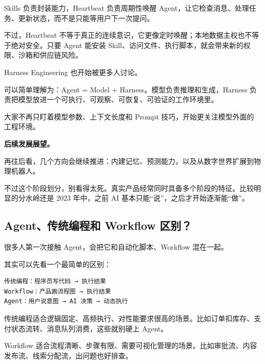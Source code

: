 \documentclass[10pt,a4paper]{ctexart}
\begin{document}
Skills 负责封装能力，Heartbeat 负责周期性唤醒 Agent，让它检查消息、处理任务、更新状态，而不是只能等用户下一次提问。



不过，Heartbeat 不等于真正的连续意识，它更像定时唤醒；本地数据主权也不等于绝对安全。只要 Agent 能安装 Skill、访问文件、执行脚本，就会带来新的权限、沙箱和供应链风险。



Harness Engineering 也开始被更多人讨论。



可以简单理解为：Agent = Model + Harness。模型负责推理和生成，Harness 负责把模型放进一个可执行、可观察、可恢复、可验证的工作环境里。



大家不再只盯着模型参数、上下文长度和 Prompt 技巧，开始更关注模型外面的工程环境。



\textbf{后续发展展望。}



再往后看，几个方向会继续推进：内建记忆、预测能力，以及从数字世界扩展到物理机器人。



不过这个阶段划分，别看得太死。真实产品经常同时具备多个阶段的特征。比较明显的分水岭还是 2023 年中，之前 AI 基本只能“说”，之后才开始逐渐能“做”。



\subsection{Agent、传统编程和 Workflow 区别？}


很多人第一次接触 Agent，会把它和自动化脚本、Workflow 混在一起。



其实可以先看一个最简单的区别：



\begin{lstlisting}
传统编程：程序员写代码 → 执行结果
Workflow：产品画流程图 → 执行结果
Agent：用户说意图 → AI 决策 → 动态执行
\end{lstlisting}



传统编程适合逻辑固定、高频执行、对性能要求很高的场景。比如订单扣库存、支付状态流转、消息队列消费，这些就别硬上 Agent。



Workflow 适合流程清晰、步骤有限、需要可视化管理的场景。比如审批流、内容发布流、线索分配流，出问题也好排查。
\end{document}
